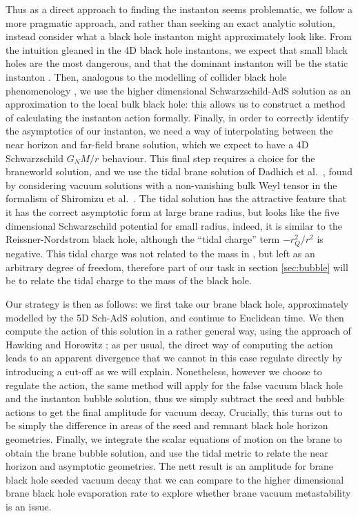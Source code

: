 \documentclass[aps,12pt,prd,superscriptaddress,preprintnumbers, 
	amssymb,
	amsmath,
	notitlepage,
	longbibliography,
	nofootinbib]{revtex4-1}
\begin{document}
Thus as a direct approach to finding the instanton seems problematic, 
we follow a more pragmatic approach, and rather than seeking an exact
analytic solution, instead consider what a black hole instanton might 
approximately look like. From the intuition gleaned in the 4D black hole
instantons, we expect that small black holes are the most dangerous,
and that the dominant instanton will be the static instanton \cite{BGM3}.
Then, analogous to the modelling of collider black hole phenomenology
\cite{Harris:2003db}, we
use the higher dimensional Schwarzschild-AdS solution as an
approximation to the local bulk black hole: this allows us to 
construct a method of calculating the instanton action formally.
Finally, in order to correctly identify the asymptotics of our instanton,
we need a way of interpolating between the near horizon 
and far-field brane solution, which we expect to have a 4D
Schwarzschild $G_NM/r$ behaviour. This final step requires 
a choice for the braneworld solution, and we use the 
tidal brane solution of Dadhich et al.\ \cite{Dadhich:2000am},
found by considering vacuum solutions with a non-vanishing
bulk Weyl tensor in the formalism of Shiromizu et al.\ \cite{Shiromizu:1999wj}.
The tidal solution has the attractive feature that it has 
the correct asymptotic form at large brane radius, but looks like
the five dimensional Schwarzschild potential for small radius,
indeed, it is similar to the Reissner-Nordstrom black hole,
although the ``tidal charge'' term $-r_Q^2/r^2$ is negative. This 
tidal charge was not related to the mass in \cite{Dadhich:2000am},
but left as an arbitrary degree of freedom, therefore part of our task 
in section \ref{sec:bubble} will be to relate the tidal charge to the
mass of the black hole. 

Our strategy is then as follows: we first take our brane black hole,
approximately modelled by the 5D Sch-AdS solution, and continue
to Euclidean time. We then compute the action of this solution 
in a rather general way, using the approach of Hawking and Horowitz
\cite{Hawking:1995fd};
as per usual, the direct way of computing the action leads to an
apparent divergence that we cannot in this case regulate directly
by introducing a cut-off as we will explain. Nonetheless, however 
we choose to regulate the action, the same method will apply for
the false vacuum black hole and the instanton bubble 
solution, thus we simply subtract the seed and bubble actions
to get the final amplitude for vacuum decay. Crucially, this turns
out to be simply the difference in areas of the seed and remnant
black hole horizon geometries. Finally, we integrate the scalar 
equations of motion on the brane to obtain the brane bubble solution,
and use the tidal metric to relate the near horizon and asymptotic
geometries. The nett result is an amplitude for brane black hole seeded
vacuum decay that we can compare to the higher dimensional
brane black hole evaporation rate to explore whether brane vacuum
metastability is an issue.
\end{document}
